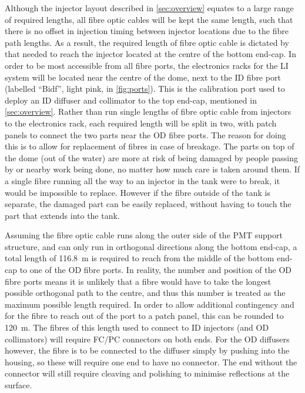 \documentclass[a4paper,11pt]{article}
\begin{document}
Although the injector layout described in \cref{sec:overview} equates to a large range of required lengths, all fibre optic cables will be kept the same length, such that there is no offset in injection timing between injector locations due to the fibre path lengths. As a result, the required length of fibre optic cable is dictated by that needed to reach the injector located at the centre of the bottom end-cap. In order to be most accessible from all fibre ports, the electronics racks for the LI system will be located near the centre of the dome, next to the ID fibre port (labelled ``Bidf'', light pink, in \cref{fig:ports}). This is the calibration port used to deploy an ID diffuser and collimator to the top end-cap, mentioned in \cref{sec:overview}. Rather than run single lengths of fibre optic cable from injectors to the electronics rack, each required length will be split in two, with patch panels to connect the two parts near the OD fibre ports. The reason for doing this is to allow for replacement of fibres in case of breakage. The parts on top of the dome (out of the water) are more at risk of being damaged by people passing by or nearby work being done, no matter how much care is taken around them. If a single fibre running all the way to an injector in the tank were to break, it would be impossible to replace. However if the fibre outside of the tank is separate, the damaged part can be easily replaced, without having to touch the part that extends into the tank.

Assuming the fibre optic cable runs along the outer side of the PMT support structure, and can only run in orthogonal directions along the bottom end-cap, a total length of 116.8~m is required to reach from the middle of the bottom end-cap to one of the OD fibre ports. In reality, the number and position of the OD fibre ports means it is unlikely that a fibre would have to take the longest possible orthogonal path to the centre, and thus this number is treated as the maximum possible length required. In order to allow additional contingency and for the fibre to reach out of the port to a patch panel, this can be rounded to 120~m. The fibres of this length used to connect to ID injectors (and OD collimators) will require FC/PC connectors on both ends. For the OD diffusers however, the fibre is to be connected to the diffuser simply by pushing into the housing, so these will require one end to have no connector. The end without the connector will still require cleaving and polishing to minimise reflections at the surface.
\end{document}
